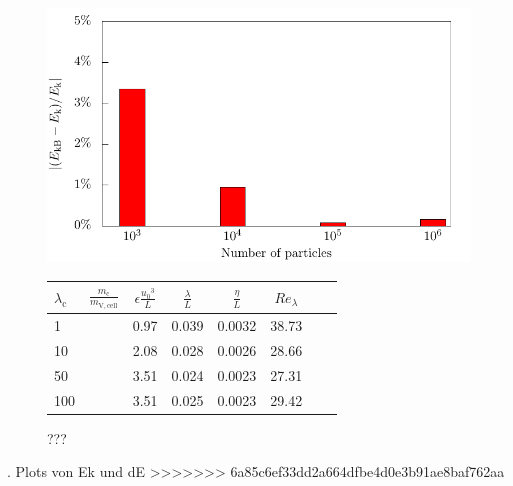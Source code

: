 \documentclass[11pt,a4paper,openany,oneside,parskip=half*]{article}
\begin{document}
\begin{figure}[h]
    \centering
    \begin{minipage}{0.5\textwidth}
        \centering
 	   \includegraphics[width=\linewidth]{./Abbildungen/kineticEnergy_numberOfParticles.pdf}
	   \caption{???}
	\label{kineticEnergy_numberofparticles}
    \end{minipage}%
        \begin{minipage}{0.5\textwidth}
        \centering
	\begin{tabular}{l l | c c c c c c }
	$\lambda_\mathrm{c}$& $\frac{m_\mathrm{c}}{m_\mathrm{V,cell}}$ & $\epsilon \frac{{u_0}^3}{L}$ & $\frac{\lambda}{L}$ & $\frac{\eta}{L} $ & $Re_\lambda$ \\
	\hline
	\hline
	1 & & 0.97& 0.039 & 0.0032 & 38.73 &\\
	10 & & 2.08 & 0.028 & 0.0026 & 28.66 &\\
	50 & & 3.51 & 0.024 & 0.0023 & 27.31 &\\
	100 & & 3.51 & 0.025 & 0.0023 & 29.42 &\\
	\hline
	\end{tabular}
	\label{table_values}
    \end{minipage}
    \end{figure}
. Plots von Ek und dE
\newline
>>>>>>> 6a85c6ef33dd2a664dfbe4d0e3b91ae8baf762aa
\end{document}
